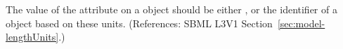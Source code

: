 The value of the attribute  on a \Model object should be
either ,  or the identifier of a
\UnitDefinition object based on these units.  (References: SBML L3V1
Section~\ref{sec:model-lengthUnits}.)
